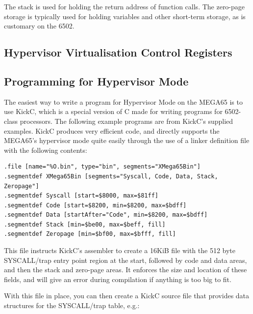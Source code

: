 The stack is used for holding the return address of function calls.  The zero-page storage is typically used for holding
variables and other short-term storage, as is customary on the 6502.

\subsection{Hypervisor Virtualisation Control Registers}



\subsection{Programming for Hypervisor Mode}

The easiest way to write a program for Hypervisor Mode on the MEGA65 is to use KickC, which is a special version of C
made for writing programs for 6502-class processors.  The following example programs are from KickC's supplied examples.
KickC produces very efficient code, and directly supports the MEGA65's
hypervisor mode quite easily through the use of a linker definition file with the following contents:

\begin{tcolorbox}[colback=black,coltext=white]
\verbatimfont{\codefont}
\begin{verbatim}
.file [name="%O.bin", type="bin", segments="XMega65Bin"]
.segmentdef XMega65Bin [segments="Syscall, Code, Data, Stack, Zeropage"]
.segmentdef Syscall [start=$8000, max=$81ff]
.segmentdef Code [start=$8200, min=$8200, max=$bdff]
.segmentdef Data [startAfter="Code", min=$8200, max=$bdff]
.segmentdef Stack [min=$be00, max=$beff, fill]
.segmentdef Zeropage [min=$bf00, max=$bfff, fill]
\end{verbatim}
\end{tcolorbox}

This file instructs KickC's assembler to create a 16KiB file with the 512 byte SYSCALL/trap entry point region at the start,
followed by code and data areas, and then the stack and zero-page areas. It enforces the size and location of these fields, and
will give an error during compilation if anything is too big to fit.

With this file in place, you can then create a KickC source file that provides data structures for the SYSCALL/trap table, e.g.:

